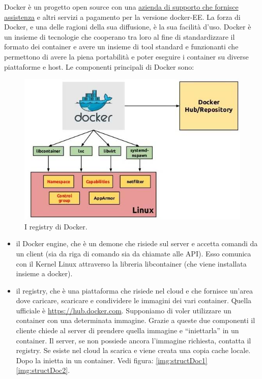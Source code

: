 Docker è un progetto open source con una \href{https://www.docker.com/company}{azienda di supporto che fornisce assistenza} e altri servizi a pagamento per la versione docker-EE. La forza di Docker, e una delle ragioni della sua diffusione, è la sua facilità d’uso. Docker è un insieme di tecnologie che cooperano tra loro al fine di standardizzare il formato dei container e avere un insieme di tool standard e funzionanti che permettono di avere la piena portabilità e poter eseguire i container su diverse piattaforme e host.
Le componenti principali di Docker sono:\\
\begin{figure}[H]
	\begin{center}
		\includegraphics[width=0.99\columnwidth]{img/docker-container_lib.jpg}
		\caption{I registry di Docker.}
		\label{img:API}
	\end{center}
\end{figure}
\begin{itemize}
\item il Docker engine, che è un demone che risiede sul server e accetta comandi da un client (sia da riga di comando sia da chiamate alle API). Esso comunica con il Kernel Linux attraverso la libreria libcontainer (che viene installata insieme a docker).\\
\item il registry, che è una piattaforma che risiede nel cloud e che fornisce un’area dove caricare, scaricare e condividere le immagini dei vari container. Quella ufficiale è \href{https://hub.docker.com/}{https://hub.docker.com}. Supponiamo di voler utilizzare un container con una determinata immagine. Grazie a queste due componenti il cliente chiede al server di prendere quella immagine e “iniettarla” in un container. Il server, se non possiede ancora l’immagine richiesta, contatta il registry. Se esiste nel cloud la scarica e viene creata una copia cache locale. Dopo la inietta in un container. Vedi figura: \ref{img:structDoc1} \ref{img:structDoc2}.\\
\end{itemize}
